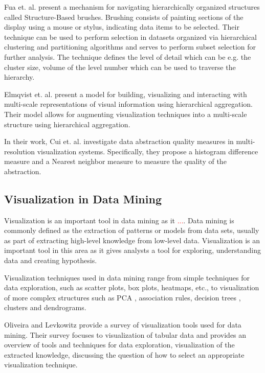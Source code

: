 Fua et. al. \cite{Fua:2000:SBM:614278.614457} present a mechanism for navigating hierarchically organized structures
called Structure-Based brushes. Brushing consists of painting sections of the display using a mouse or stylus, indicating
data items to be selected. Their technique can be used to perform selection in datasets organized via hierarchical
clustering and partitioning algorithms and serves to perform subset selection for further analysis. The technique defines
the level of detail which can be e.g. the cluster size, volume of the level number which can be used to traverse the
hierarchy.

Elmqvist et. al. \cite{Elmqvist:2010:HAI:1749404.1749525} present a model for building, visualizing and interacting with
multi-scale representations of visual information using hierarchical aggregation. Their model allows for augmenting visualization
techniques into a multi-scale structure using hierarchical aggregation.

In their work, Cui et. al. \cite{4015421} investigate data abstraction quality measures in multi-resolution
visualization systems. Specifically, they propose a histogram difference measure and a Nearest neighbor
measure to measure the quality of the abstraction.

\subsection{Visualization in Data Mining}

Visualization is an important tool in data mining as it \textcolor{red}{...}. Data mining is commonly defined
as the extraction of patterns or models from data sets, usually as part of extracting high-level
knowledge from low-level data. Visualization is an important tool in this area as it gives analysts a
tool for exploring, understanding data and creating hypothesis.

Visualization techniques used in data mining range from simple techniques for data exploration, such as
scatter plots, box plots, heatmaps, etc., to visualization of more complex structures such as PCA ,
association rules, decision trees , clusters and dendrograms.

Oliveira and Levkowitz \cite{1207445} provide a survey of visualization tools used for data mining. Their survey focuses
to visualization of tabular data and provides an overview of tools and techniques for data exploration,
visualization of the extracted knowledge, discussing the question of how to select an appropriate visualization
technique.


